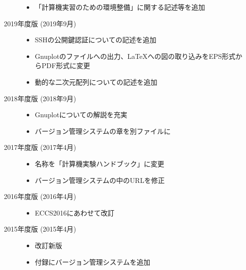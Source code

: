 \begin{description}
          \begin{itemize}
              \item 「計算機実習のための環境整備」に関する記述等を追加
          \end{itemize}

    \item[2019年度版 (2019年9月)] \mbox{}

          \begin{itemize}
              \item SSHの公開鍵認証についての記述を追加
              \item Gnuplotのファイルへの出力、\LaTeX への図の取り込みをEPS形式からPDF形式に変更
              \item 動的な二次元配列についての記述を追加
          \end{itemize}

    \item[2018年度版 (2018年9月)] \mbox{}

          \begin{itemize}
              \item Gnuplotについての解説を充実
              \item バージョン管理システムの章を別ファイルに
          \end{itemize}

    \item[2017年度版 (2017年4月)] \mbox{}

          \begin{itemize}
              \item 名称を「計算機実験ハンドブック」に変更
              \item バージョン管理システムの中のURLを修正
          \end{itemize}

    \item[2016年度版 (2016年4月)] \mbox{}

          \begin{itemize}
              \item ECCS2016にあわせて改訂
          \end{itemize}

    \item[2015年度版 (2015年4月)] \mbox{}

          \begin{itemize}
              \item 改訂新版
              \item 付録にバージョン管理システムを追加
          \end{itemize}

\end{description}
